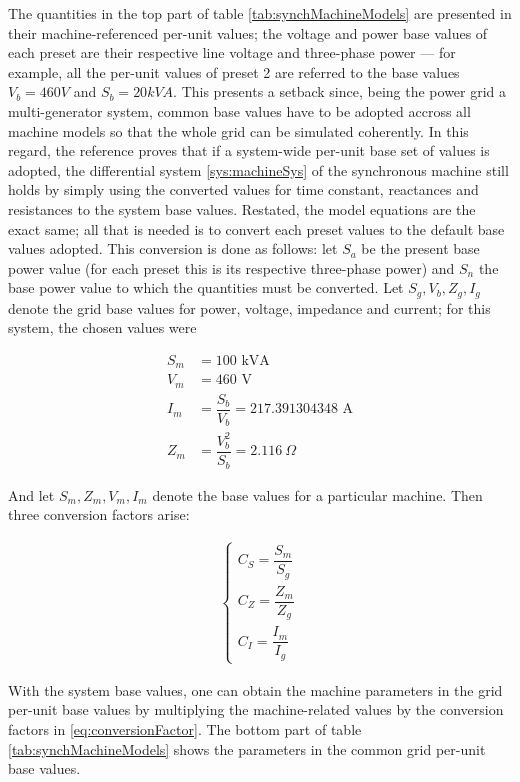 	The quantities in the top part of table \ref{tab:synchMachineModels} are presented in their machine-referenced per-unit values; the voltage and power base values of each preset are their respective line voltage and three-phase power --- for example, all the per-unit values of preset 2 are referred to the base values $V_b = 460V$ and $S_b = 20kVA$. This presents a setback since, being the power grid a multi-generator system, common base values have to be adopted accross all machine models so that the whole grid can be simulated coherently. In this regard, the reference \cite{Ramos2000} proves that if a system-wide per-unit base set of values is adopted, the differential system \eqref{sys:machineSys} of the synchronous machine still holds by simply using the converted values for time constant, reactances and resistances to the system base values. Restated, the model equations are the exact same; all that is needed is to convert each preset values to the default base values adopted. This conversion is done as follows: let $S_a$ be the present base power value (for each preset this is its respective three-phase power) and $S_n$ the base power value to which the quantities must be converted. Let $S_g, V_b, Z_g, I_g$ denote the grid base values for power, voltage, impedance and current; for this system, the chosen values were

\begin{align}
	S_m &= 100 \text{ kVA} \\[3mm]
	V_m &= 460 \text{ V} \\[3mm]
	I_m &= \dfrac{S_b}{V_b} = 217.391304348 \text{ A} \\[3mm]
	Z_m &= \dfrac{V_b^2}{S_b} = 2.116\ \Omega
\end{align}

	And let $S_m, Z_m, V_m, I_m$ denote the base values for a particular machine. Then three conversion factors arise:

\begin{align}
	\left\{\begin{array}{l}
		C_S = \dfrac{S_m}{S_g} \\[5mm]
		C_Z = \dfrac{Z_m}{Z_g} \\[5mm]
		C_I = \dfrac{I_m}{I_g}
	\end{array}\right.\label{eq:conversionFactor}
\end{align}

	With the system base values, one can obtain the machine parameters in the grid per-unit base values by multiplying the machine-related values by the conversion factors in \eqref{eq:conversionFactor}. The bottom part of table \eqref{tab:synchMachineModels} shows the parameters in the common grid per-unit base values.
	
